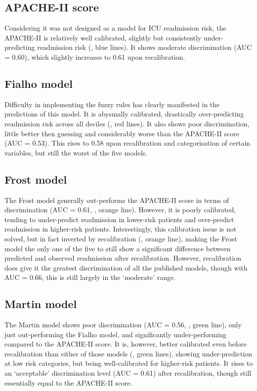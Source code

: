 \documentclass[onecolumn]{article}
\begin{document}
\subsection{APACHE-II score}

Considering it was not designed as a model for ICU readmission risk, the APACHE-II is relatively well calibrated, slightly but consistently under-predicting readmission risk (, blue lines). It shows moderate discrimination (AUC = 0.60), which slightly increases to 0.61 upon recalibration. 

\subsection{Fialho model}

Difficulty in implementing the fuzzy rules has clearly manifested in the predictions of this model. It is abysmally calibrated, drastically over-predicting readmission risk across all deciles (, red lines). It also shows poor discrimination, little better then guessing and considerably worse than the APACHE-II score (AUC = 0.53). This rises to 0.58 upon recalibration and categorisation of certain variables, but still the worst of the five models.

\subsection{Frost model}

The Frost model generally out-performs the APACHE-II score in terms of discrimination (AUC = 0.61, , orange line). However, it is poorly calibrated, tending to under-predict readmission in lower-risk patients and over-predict readmission in higher-risk patients. Interestingly, this calibration issue is not solved, but in fact inverted by recalibration (, orange line), making the Frost model the only one of the five to still show a significant difference between predicted and observed readmission after recalibration. However, recalibration does give it the greatest discrimination of all the published models, though with AUC = 0.66, this is still largely in the `moderate' range.

\subsection{Martin model}

The Martin model shows poor discrimination (AUC = 0.56, , green line), only just out-performing the Fialho model, and significantly under-performing compared to the APACHE-II score. It is, however, better calibrated even before recalibration than either of those models (, green lines), showing under-prediction at low risk categories, but being well-calibrated for higher-risk patients. It rises to an `acceptable' discrimination level (AUC = 0.61) after recalibration, though still essentially equal to the APACHE-II score.
\end{document}
